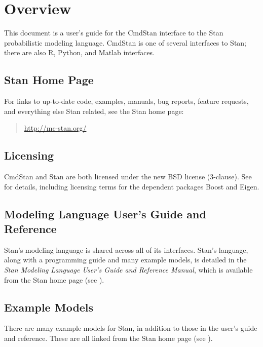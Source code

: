 \chapter{Overview}

\noindent
This document is a user's guide for the CmdStan interface to the Stan
probabilistic modeling language. CmdStan is one of several interfaces
to Stan; there are also R, Python, and Matlab interfaces.

\section{Stan Home Page}\label{home-page.section}

For links to up-to-date code, examples, manuals, bug reports, feature
requests, and everything else Stan related, see the Stan home page:
%
\begin{quote}
\url{http://mc-stan.org/}
\end{quote}


\section{Licensing}

CmdStan and Stan are both licensed under the new BSD license
(3-clause). See  for details, including
licensing terms for the dependent packages Boost and Eigen.


\section{Modeling Language User's Guide and Reference}

Stan's modeling language is shared across all of its interfaces.
Stan's language, along with a programming guide and many example
models, is detailed in the {\it Stan Modeling Language User's Guide
  and Reference Manual}, which is available from the Stan home page
(see ).

\section{Example Models}

There are many example models for Stan, in addition to those in the
user's guide and reference. These are all linked from the Stan home
page (see ).
